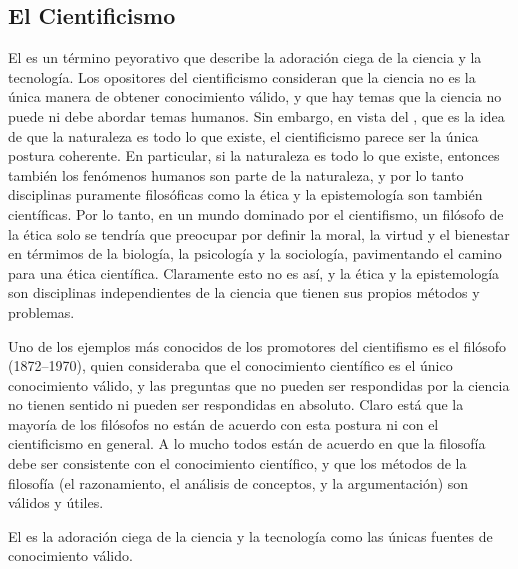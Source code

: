 \subsection*{El Cientificismo}
\label{sub:cientificismo}
El  es un término peyorativo que describe la
adoración ciega de la ciencia y la tecnología.
Los opositores del cientificismo consideran que la ciencia no es la única manera
de obtener conocimiento válido, y que hay temas que la ciencia no puede ni debe
abordar temas humanos.
Sin embargo, en vista del , que es la idea de que la
naturaleza es todo lo que existe, el cientificismo parece ser la única postura
coherente.
En particular, si la naturaleza es todo lo que existe, entonces también los
fenómenos humanos son parte de la naturaleza, y por lo tanto disciplinas
puramente filosóficas como la ética y la epistemología son también científicas.
Por lo tanto, en un mundo dominado por el cientifismo, un filósofo de la ética
solo se tendría que preocupar por definir la moral, la virtud y el bienestar en
térmimos de la biología, la psicología y la sociología, pavimentando el camino
para una ética científica.
Claramente esto no es así, y la ética y la epistemología son disciplinas
independientes de la ciencia que tienen sus propios métodos y problemas.

Uno de los ejemplos más conocidos de los promotores del cientifismo es el
filósofo  (1872--1970), quien
consideraba que el conocimiento científico es el único conocimiento válido, y
las preguntas que no pueden ser respondidas por la ciencia no tienen sentido
ni pueden ser respondidas en absoluto.
Claro está que la mayoría de los filósofos no están de acuerdo con esta postura
ni con el cientificismo en general.
A lo mucho todos están de acuerdo en que la filosofía debe ser consistente con
el conocimiento científico, y que los métodos de la filosofía (el razonamiento,
el análisis de conceptos, y la argumentación) son válidos y útiles.

\begin{remember}
    \label{rem:cientificismo}
    El  es la adoración ciega de la ciencia y la
    tecnología como las únicas fuentes de conocimiento válido.
\end{remember}

